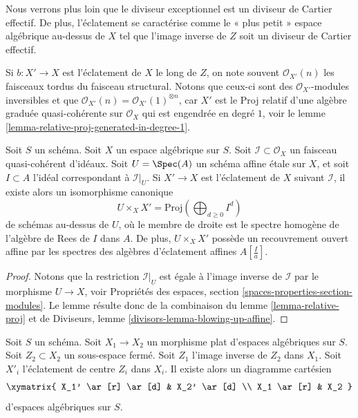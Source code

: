 \noindent
Nous verrons plus loin que le diviseur exceptionnel est un diviseur de Cartier
effectif. De plus, l'éclatement se caractérise comme le « plus petit »
espace algébrique au-dessus de $X$ tel que l'image inverse de $Z$ soit un
diviseur de Cartier effectif.

\medskip\noindent
Si $b : X' \to X$ est l'éclatement de $X$ le long de $Z$, on note souvent
$\mathcal{O}_{X'}(n)$ les faisceaux tordus du faisceau structural. Notons que ceux-ci
sont des $\mathcal{O}_{X'}$-modules inversibles et que
$\mathcal{O}_{X'}(n) = \mathcal{O}_{X'}(1)^{\otimes n}$,
car $X'$ est le Proj relatif d'une algèbre graduée quasi-cohérente
sur $\mathcal{O}_X$ qui est engendrée en degré $1$, voir le
lemme \ref{lemma-relative-proj-generated-in-degree-1}.

\begin{lemma}
\label{lemma-blowing-up-affine}
Soit $S$ un schéma. Soit $X$ un espace algébrique sur $S$.
Soit $\mathcal{I} \subset \mathcal{O}_X$ un
faisceau quasi-cohérent d'idéaux. Soit $U = \Spec(A)$ un schéma affine
\'etale sur $X$, et soit $I \subset A$ l'idéal correspondant à
$\mathcal{I}|_U$. Si $X' \to X$ est l'éclatement de $X$ suivant $\mathcal{I}$,
il existe alors un isomorphisme canonique
$$
U \times_X X' = \text{Proj}(\bigoplus\nolimits_{d \geq 0} I^d)
$$
de schémas au-dessus de $U$, où le membre de droite est
le spectre homogène de l'algèbre de Rees de $I$ dans $A$.
De plus, $U \times_X X'$ possède un recouvrement ouvert affine par les
spectres des algèbres d'éclatement affines $A[\frac{I}{a}]$.
\end{lemma}

\begin{proof}
Notons que la restriction $\mathcal{I}|_U$ est égale à l'image inverse
de $\mathcal{I}$ par le morphisme $U \to X$, voir
Propriétés des espaces, section \ref{spaces-properties-section-modules}.
Le lemme résulte donc de la combinaison du lemme \ref{lemma-relative-proj} et de
Diviseurs, lemme \ref{divisors-lemma-blowing-up-affine}.
\end{proof}

\begin{lemma}
\label{lemma-flat-base-change-blowing-up}
Soit $S$ un schéma.
Soit $X_1 \to X_2$ un morphisme plat d'espaces algébriques sur $S$.
Soit $Z_2 \subset X_2$ un sous-espace fermé.
Soit $Z_1$ l'image inverse de $Z_2$ dans $X_1$.
Soit $X'_i$ l'éclatement de centre $Z_i$ dans $X_i$. Il existe alors un diagramme
cartésien
$$
\xymatrix{
X_1' \ar[r] \ar[d] & X_2' \ar[d] \\
X_1 \ar[r] & X_2
}
$$
d'espaces algébriques sur $S$.
\end{lemma}

